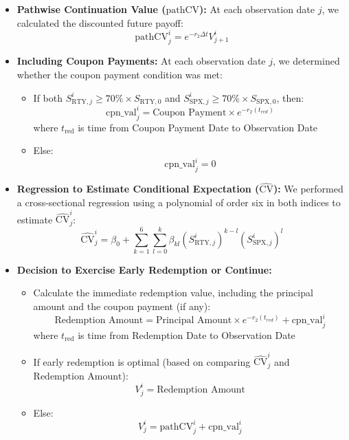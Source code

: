 \documentclass[12pt,a4paper]{article}
\begin{document}
\begin{itemize}
    \item \textbf{Pathwise Continuation Value (\( \text{pathCV} \)):} At each observation date \( j \), we calculated the discounted future payoff:
    \[
    \text{pathCV}^{i}_{j} = e^{-r_2 \Delta t} V^{i}_{j+1}
    \]
    \item \textbf{Including Coupon Payments:} At each observation date \( j \), we determined whether the coupon payment condition was met:
    \begin{itemize}
        \item If both \( S_{\text{RTY},j}^{i} \geq 70\% \times S_{\text{RTY},0} \) and \( S_{\text{SPX},j}^{i} \geq 70\% \times S_{\text{SPX},0} \), then:
        \[
        \text{cpn\_val}^{i}_{j} = \text{Coupon Payment} \times e^{-r_2 (\text{$t_{red}$})}
        \]
	 where \(t_{\text{red}}\) is time from Coupon Payment Date to Observation Date
        \item Else:
        \[
        \text{cpn\_val}^{i}_{j} = 0
        \]
    \end{itemize}
    \item \textbf{Regression to Estimate Conditional Expectation (\( \hat{\text{CV}} \)):} We performed a cross-sectional regression using a polynomial of order six in both indices to estimate \( \hat{\text{CV}}^{i}_{j} \):
    \[
    \hat{\text{CV}}^{i}_{j} = \beta_0 + \sum_{k=1}^6 \sum_{l=0}^{k} \beta_{kl} \left( S_{\text{RTY},j}^{i} \right)^{k-l} \left( S_{\text{SPX},j}^{i} \right)^{l}
    \]
    \item \textbf{Decision to Exercise Early Redemption or Continue:}
    \begin{itemize}
        \item Calculate the immediate redemption value, including the principal amount and the coupon payment (if any):
        \[
        \text{Redemption Amount} = \text{Principal Amount} \times e^{-r_2 (\text{$t_{red}$})} + \text{cpn\_val}^{i}_{j}
        \]
	 where \(t_{\text{red}}\) is time from Redemption Date to Observation Date
        \item If early redemption is optimal (based on comparing \( \hat{\text{CV}}^{i}_{j} \) and \( \text{Redemption Amount} \)):
        \[
        V^{i}_{j} = \text{Redemption Amount}
        \]
        \item Else:
        \[
        V^{i}_{j} = \text{pathCV}^{i}_{j} + \text{cpn\_val}^{i}_{j}
        \]
    \end{itemize}
\end{itemize}
\end{document}
